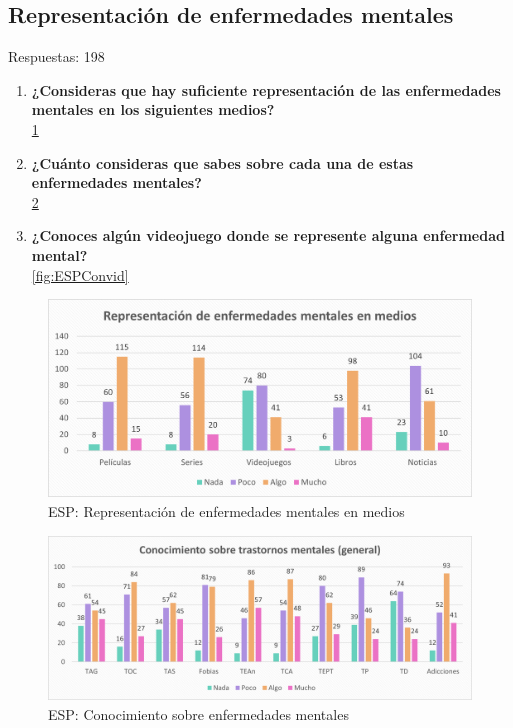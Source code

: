 \documentclass[12pt, a4paper,twoside,titlepage]{book}
\begin{document}
\subsection{Representación de enfermedades mentales}
Respuestas: 198
\begin{enumerate}[label=\textbf{\arabic*}.]
     \item \textbf{¿Consideras que hay suficiente representación de las enfermedades mentales en los siguientes medios? }\\
     \ref{fig:ESPMedios}
     \item \textbf{¿Cuánto consideras que sabes sobre cada una de estas enfermedades mentales? }\\
     \ref{fig:ESPCon}
     \item \textbf{¿Conoces algún videojuego donde se represente alguna enfermedad mental? }\\
     \ref{fig:ESPConvid}
\end{enumerate}



\begin{figure}
    \centering
    \includegraphics[width=1\linewidth]{ANEXO ESP/7AnexESPMedios}
    \caption{ESP: Representación de enfermedades mentales en medios}
    \label{fig:ESPMedios}
\end{figure}


\begin{figure}
    \centering
    \includegraphics[width=1\linewidth]{ANEXO ESP/8AnexESPCon}
    \caption{ESP: Conocimiento sobre enfermedades mentales}
    \label{fig:ESPCon}
\end{figure}
\end{document}
